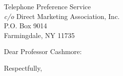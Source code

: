 \documentclass[10pt]{letter}
\date{\today}
\begin{document}
\begin{letter}{Telephone Preference Service \\
               {\it c/o} Direct Marketing Association, Inc. \\
               P.O. Box 9014 \\
               Farmingdale, NY  11735}   
                           
\opening{Dear Professor Cashmore:}




\closing{Respectfully,}


\end{letter}
\end{document}
